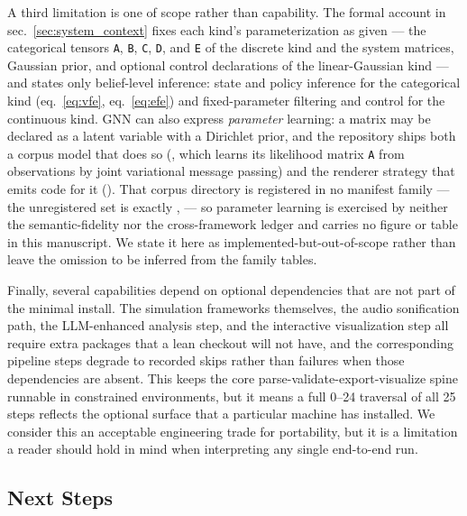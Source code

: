\documentclass[
  english,
  9pt,
]{extarticle}
\begin{document}
A third limitation is one of scope rather than capability. The formal
account in sec.~\ref{sec:system_context} fixes each kind's
parameterization as given --- the categorical tensors \texttt{A},
\texttt{B}, \texttt{C}, \texttt{D}, and \texttt{E} of the discrete kind
and the system matrices, Gaussian prior, and optional control
declarations of the linear-Gaussian kind --- and states only
belief-level inference: state and policy inference for the categorical
kind (eq.~\ref{eq:vfe}, eq.~\ref{eq:efe}) and fixed-parameter filtering
and control for the continuous kind. GNN can also express
\emph{parameter} learning: a matrix may be declared as a latent variable
with a Dirichlet prior, and the repository ships both a corpus model
that does so
(,
which learns its likelihood matrix \texttt{A} from observations by joint
variational message passing) and the renderer strategy that emits code
for it (). That
corpus directory is registered in no manifest family --- the
unregistered set is exactly ,
 --- so parameter learning is
exercised by neither the semantic-fidelity nor the cross-framework
ledger and carries no figure or table in this manuscript. We state it
here as implemented-but-out-of-scope rather than leave the omission to
be inferred from the family tables.

Finally, several capabilities depend on optional dependencies that are
not part of the minimal install. The simulation frameworks themselves,
the audio sonification path, the LLM-enhanced analysis step, and the
interactive visualization step all require extra packages that a lean
checkout will not have, and the corresponding pipeline steps degrade to
recorded skips rather than failures when those dependencies are absent.
This keeps the core parse-validate-export-visualize spine runnable in
constrained environments, but it means a full 0--24 traversal of all 25
steps reflects the optional surface that a particular machine has
installed. We consider this an acceptable engineering trade for
portability, but it is a limitation a reader should hold in mind when
interpreting any single end-to-end run.

\subsection{Next Steps}\label{next-steps}
\end{document}
